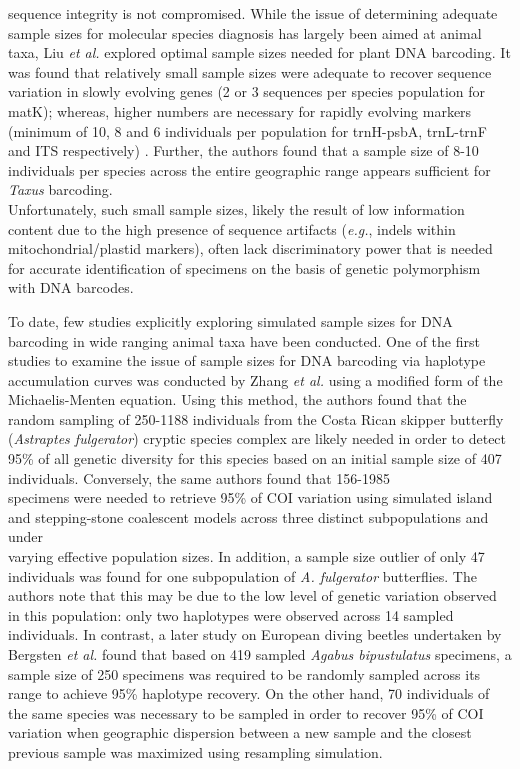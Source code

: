 sequence integrity is not compromised. While the issue of determining adequate sample sizes for molecular species diagnosis has largely been aimed at animal taxa, Liu \textit{et al.} \cite{liu2012sampling} explored optimal sample sizes needed for plant DNA barcoding. It was found that relatively small sample sizes were adequate to recover sequence variation in slowly evolving genes (2 or 3 sequences per species population for matK); whereas, higher numbers are necessary for rapidly evolving markers (minimum of 10, 8 and 6 individuals per population for trnH-psbA, trnL-trnF and ITS respectively) \cite{liu2012sampling}. Further, the authors found that a sample size of 8-10 individuals per species across the entire geographic range appears sufficient for \textit{Taxus} barcoding. \\ Unfortunately, such small sample sizes, likely the result of low information content due to the high presence of sequence artifacts (\textit{e.g.}, indels within mitochondrial/plastid markers), often lack discriminatory power that is needed for accurate identification of specimens on the basis of genetic polymorphism with DNA barcodes.

 

To date, few studies explicitly exploring simulated sample sizes for DNA barcoding in wide ranging animal taxa have been conducted. One of the first studies to examine the issue of sample sizes for DNA barcoding via haplotype accumulation curves was conducted by Zhang \textit{et al.} \cite{zhang2010estimating} using a modified form of the Michaelis-Menten equation. Using this method, the authors found that the random sampling of 250-1188 individuals from the Costa Rican skipper butterfly (\textit{Astraptes fulgerator}) cryptic species complex are likely needed in order to detect 95\% of all genetic diversity for this species based on an initial sample size of 407 individuals. Conversely, the same authors found that 156-1985 \\ specimens were needed to retrieve 95\% of COI variation using simulated island \cite{wright1951genetical} and stepping-stone \cite{kimura1964stepping} coalescent models across three distinct subpopulations and under \\ varying effective population sizes. In addition, a sample size outlier of only 47 individuals was found for one subpopulation of \textit{A. fulgerator} butterflies.  The authors note that this may be due to the low level of genetic variation observed in this population: only two haplotypes were observed across 14 sampled individuals. In contrast, a later study on European diving beetles undertaken by Bergsten \textit{et al.} \cite{bergsten2012effect} found that based on 419 sampled \textit{Agabus bipustulatus} specimens, a sample size of 250 specimens was required to be randomly sampled across its range to achieve 95\% haplotype recovery. On the other hand, 70 individuals of the same species was necessary to be sampled in order to recover 95\% of COI variation when geographic dispersion between a new sample and the closest previous sample was maximized using resampling simulation. 



